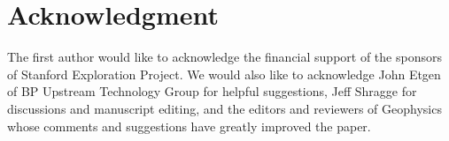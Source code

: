 \section{Acknowledgment}
The first author would like to acknowledge the financial support
of the sponsors of Stanford Exploration Project.
We would also like to acknowledge John Etgen 
of BP Upstream Technology Group for helpful suggestions,
Jeff Shragge for discussions and manuscript editing, and 
the editors and reviewers of Geophysics whose comments 
and suggestions have greatly improved the paper.
